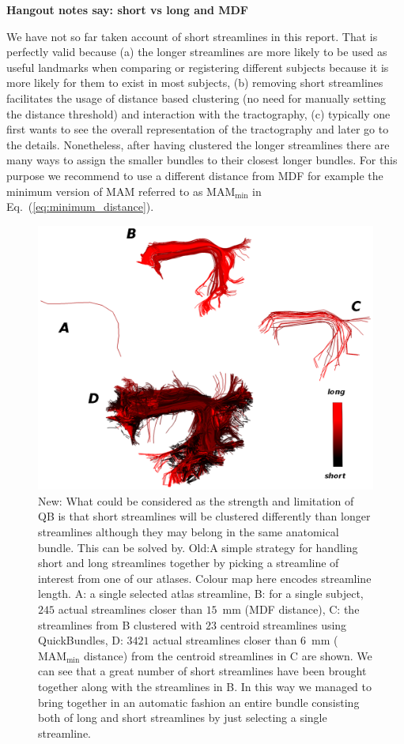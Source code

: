 \documentclass{bioinfo}
\begin{document}
\textbf{Hangout notes say: short vs long and MDF}

We have not so far taken account of short streamlines in this
report. That is perfectly valid because (a) the longer streamlines are
more likely to be used as useful landmarks when comparing or registering
different subjects because it is more likely for them to exist in most
subjects, (b) removing short streamlines facilitates the usage of
distance based clustering (no need for manually setting the distance
threshold) and interaction with the tractography, (c) typically one
first wants to see the overall representation of the tractography and
later go to the details. Nonetheless, after having clustered the longer
streamlines there are many ways to assign the smaller bundles to their
closest longer bundles. For this purpose we recommend to use a different
distance from MDF for example the minimum version of MAM referred to as
$\textrm{MAM}_{\textrm{min}}$ in Eq.~(\ref{eq:minimum_distance}).

%
\begin{figure}
\centerline{\hspace{-1.5mm}\includegraphics[scale=0.65]{Figures/Fig_10_arcuate_small_fibers}}
\caption{New: What could be considered as the strength and limitation of QB is that short streamlines will be clustered differently than longer streamlines although they may belong in the same anatomical bundle. This can be solved by. Old:A simple strategy for handling short and long
  streamlines together by picking a streamline of interest from one of
  our atlases. Colour map here encodes streamline length. A: a single
  selected atlas streamline, B: for a single subject, $245$ actual
  streamlines closer than $15$~mm (MDF distance), C: the streamlines
  from B clustered with $23$ centroid streamlines using QuickBundles, D:
  $\num{3421}$ actual streamlines closer than $6$~mm
  ($\textrm{MAM}_{\textrm{min}}$ distance) from the centroid streamlines
  in C are shown. We can see that a great number of short streamlines
  have been brought together along with the streamlines in B. In this
  way we managed to bring together in an automatic fashion an entire
  bundle consisting both of long and short streamlines by just selecting
  a single streamline.\label{Flo:arcuate_close}}
\end{figure}
\end{document}

